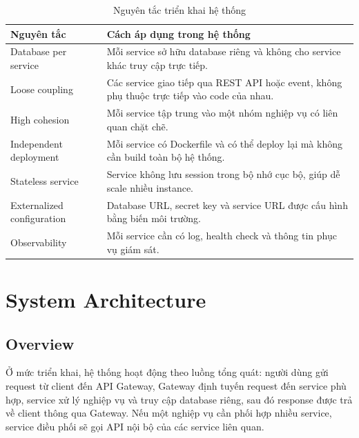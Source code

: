 \documentclass[../main.tex]{subfiles}
\begin{document}
\begin{table}[H]
    \centering
    \caption{Nguyên tắc triển khai hệ thống}
    \label{tab:chapter4-principles}
    \begin{tabular}{|p{}|p{}|}
        \hline
        \rowcolor{primary!35}
        \textbf{Nguyên tắc} & \textbf{Cách áp dụng trong hệ thống} \\
        \hline
        Database per service & Mỗi service sở hữu database riêng và không cho service khác truy cập trực tiếp. \\
        \hline
        Loose coupling & Các service giao tiếp qua REST API hoặc event, không phụ thuộc trực tiếp vào code của nhau. \\
        \hline
        High cohesion & Mỗi service tập trung vào một nhóm nghiệp vụ có liên quan chặt chẽ. \\
        \hline
        Independent deployment & Mỗi service có Dockerfile và có thể deploy lại mà không cần build toàn bộ hệ thống. \\
        \hline
        Stateless service & Service không lưu session trong bộ nhớ cục bộ, giúp dễ scale nhiều instance. \\
        \hline
        Externalized configuration & Database URL, secret key và service URL được cấu hình bằng biến môi trường. \\
        \hline
        Observability & Mỗi service cần có log, health check và thông tin phục vụ giám sát. \\
        \hline
    \end{tabular}
\end{table}

\section{System Architecture}
\label{section:4.2}

\subsection{Overview}
\label{subsection:4.2.1}

Ở mức triển khai, hệ thống hoạt động theo luồng tổng quát: người dùng gửi request từ client đến API Gateway, Gateway định tuyến request đến service phù hợp, service xử lý nghiệp vụ và truy cập database riêng, sau đó response được trả về client thông qua Gateway. Nếu một nghiệp vụ cần phối hợp nhiều service, service điều phối sẽ gọi API nội bộ của các service liên quan.
\end{document}
